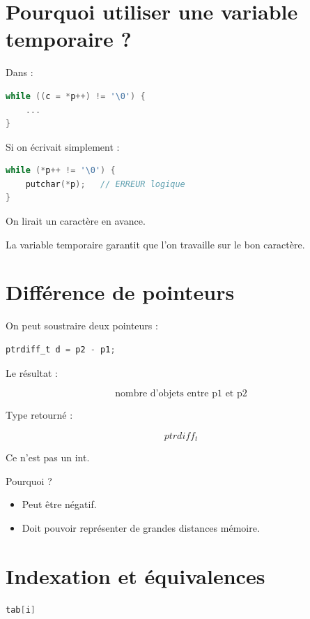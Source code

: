 \section{Pourquoi utiliser une variable temporaire ?}

Dans :

\begin{lstlisting}[language=C]
while ((c = *p++) != '\0') {
    ...
}
\end{lstlisting}

Si on écrivait simplement :

\begin{lstlisting}[language=C]
while (*p++ != '\0') {
    putchar(*p);   // ERREUR logique
}
\end{lstlisting}

On lirait un caractère en avance.

La variable temporaire garantit que
l’on travaille sur le bon caractère.

\section{Différence de pointeurs}

On peut soustraire deux pointeurs :

\begin{lstlisting}[language=C]
ptrdiff_t d = p2 - p1;
\end{lstlisting}

Le résultat :

\[
\boxed{
\text{nombre d’objets entre p1 et p2}
}
\]

Type retourné :

\[
\boxed{
ptrdiff_t
}
\]

Ce n’est pas un int.

Pourquoi ?

\begin{itemize}
\item Peut être négatif.
\item Doit pouvoir représenter de grandes distances mémoire.
\end{itemize}

\section{Indexation et équivalences}

\begin{lstlisting}[language=C]
tab[i]
\end{lstlisting}

